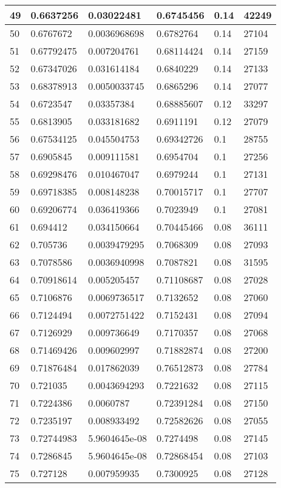\begin{longtable}{|l|l|l|l|l|l|}
49 & 0.6637256 & 0.03022481 & 0.6745456 & 0.14 & 42249 \\ \hline 
50 & 0.6767672 & 0.0036968698 & 0.6782764 & 0.14 & 27104 \\ \hline 
51 & 0.67792475 & 0.007204761 & 0.68114424 & 0.14 & 27159 \\ \hline 
52 & 0.67347026 & 0.031614184 & 0.6840229 & 0.14 & 27133 \\ \hline 
53 & 0.68378913 & 0.0050033745 & 0.6865296 & 0.14 & 27077 \\ \hline 
54 & 0.6723547 & 0.03357384 & 0.68885607 & 0.12 & 33297 \\ \hline 
55 & 0.6813905 & 0.033181682 & 0.6911191 & 0.12 & 27079 \\ \hline 
56 & 0.67534125 & 0.045504753 & 0.69342726 & 0.1 & 28755 \\ \hline 
57 & 0.6905845 & 0.009111581 & 0.6954704 & 0.1 & 27256 \\ \hline 
58 & 0.69298476 & 0.010467047 & 0.6979244 & 0.1 & 27131 \\ \hline 
59 & 0.69718385 & 0.008148238 & 0.70015717 & 0.1 & 27707 \\ \hline 
60 & 0.69206774 & 0.036419366 & 0.7023949 & 0.1 & 27081 \\ \hline 
61 & 0.694412 & 0.034150664 & 0.70445466 & 0.08 & 36111 \\ \hline 
62 & 0.705736 & 0.0039479295 & 0.7068309 & 0.08 & 27093 \\ \hline 
63 & 0.7078586 & 0.0036940998 & 0.7087821 & 0.08 & 31595 \\ \hline 
64 & 0.70918614 & 0.005205457 & 0.71108687 & 0.08 & 27028 \\ \hline 
65 & 0.7106876 & 0.0069736517 & 0.7132652 & 0.08 & 27060 \\ \hline 
66 & 0.7124494 & 0.0072751422 & 0.7152431 & 0.08 & 27094 \\ \hline 
67 & 0.7126929 & 0.009736649 & 0.7170357 & 0.08 & 27068 \\ \hline 
68 & 0.71469426 & 0.009602997 & 0.71882874 & 0.08 & 27200 \\ \hline 
69 & 0.71876484 & 0.017862039 & 0.76512873 & 0.08 & 27784 \\ \hline 
70 & 0.721035 & 0.0043694293 & 0.7221632 & 0.08 & 27115 \\ \hline 
71 & 0.7224386 & 0.0060787 & 0.72391284 & 0.08 & 27150 \\ \hline 
72 & 0.7235197 & 0.008933492 & 0.72582626 & 0.08 & 27055 \\ \hline 
73 & 0.72744983 & 5.9604645e-08 & 0.7274498 & 0.08 & 27145 \\ \hline 
74 & 0.7286845 & 5.9604645e-08 & 0.72868454 & 0.08 & 27103 \\ \hline 
75 & 0.727128 & 0.007959935 & 0.7300925 & 0.08 & 27128 \\ \hline 
\end{longtable}